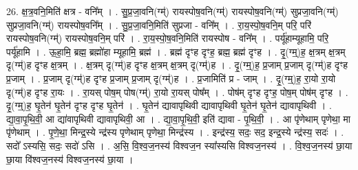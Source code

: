 \documentclass[17pt]{extarticle}
\begin{document}
26. क्ष॒त्र॒वनि॒मिति॑ क्षत्र - वनि᳚म् । . सु॒प्र॒जा॒वनि(ग्म्॑) रायस्पोष॒वनि(ग्म्॑) रायस्पोष॒वनि(ग्म्॑) सुप्रजा॒वनि(ग्म्॑) सुप्रजा॒वनि(ग्म्॑) रायस्पोष॒वनि᳚म् । . सु॒प्र॒जा॒वनि॒मिति॑ सुप्रजा - वनि᳚म् । . रा॒य॒स्पो॒ष॒वनि॒म् परि॒ परि॑ रायस्पोष॒वनि(ग्म्॑) रायस्पोष॒वनि॒म् परि॑ । . रा॒य॒स्पो॒ष॒वनि॒मिति॑ रायस्पोष - वनि᳚म् । . पर्यू॑हाम्यूहामि॒ परि॒ पर्यू॑हामि । . ऊ॒हा॒मि॒ ब्रह्म॒ ब्रह्मो॑हा म्यूहामि॒ ब्रह्म॑ । . ब्रह्म॑ दृꣳह दृꣳह॒ ब्रह्म॒ ब्रह्म॑ दृꣳह । . दृ॒(ग्म्॒)ह॒ क्ष॒त्रम् क्ष॒त्रम् दृ(ग्म्॑)ह दृꣳह क्ष॒त्रम् । . क्ष॒त्रम् दृ(ग्म्॑)ह दृꣳह क्ष॒त्रम् क्ष॒त्रम् दृ(ग्म्॑)ह । . दृ॒(ग्म्॒)ह॒ प्र॒जाम् प्र॒जाम् दृ(ग्म्॑)ह दृꣳह प्र॒जाम् । . प्र॒जाम् दृ(ग्म्॑)ह दृꣳह प्र॒जाम् प्र॒जाम् दृ(ग्म्॑)ह । . प्र॒जामिति॑ प्र - जाम् । . दृ॒(ग्म्॒)ह॒ रा॒यो रा॒यो दृ(ग्म्॑)ह दृꣳह रा॒यः । . रा॒यस् पोष॒म् पोष(ग्म्॑) रा॒यो रा॒यस् पोष᳚म् । . पोष॑म् दृꣳह दृꣳह॒ पोष॒म् पोष॑म् दृꣳह । . दृ॒(ग्म्॒)ह॒ घृ॒तेन॑ घृ॒तेन॑ दृꣳह दृꣳह घृ॒तेन॑ । . घृ॒तेन॑ द्यावापृथिवी द्यावापृथिवी घृ॒तेन॑ घृ॒तेन॑ द्यावापृथिवी । . द्या॒वा॒पृ॒थि॒वी॒ आ द्या॑वापृथिवी द्यावापृथिवी॒ आ । . द्या॒वा॒पृ॒थि॒वी॒ इति॑ द्यावा - पृ॒थि॒वी॒ । . आ पृ॑णेथाम् पृणेथा॒ मा पृ॑णेथाम् । . पृ॒णे॒था॒ मिन्द्र॒स्ये न्द्र॑स्य पृणेथाम् पृणेथा॒ मिन्द्र॑स्य । . इन्द्र॑स्य॒ सदः॒ सद॒ इन्द्र॒स्ये न्द्र॑स्य॒ सदः॑ । . सदो᳚ ऽस्यसि॒ सदः॒ सदो॑ ऽसि । . अ॒सि॒ वि॒श्व॒ज॒नस्य॑ विश्वज॒न स्या᳚स्यसि विश्वज॒नस्य॑ । . वि॒श्व॒ज॒नस्य॑ छा॒या छा॒या वि॑श्वज॒नस्य॑ विश्वज॒नस्य॑ छा॒या । \newline
\end{document}
